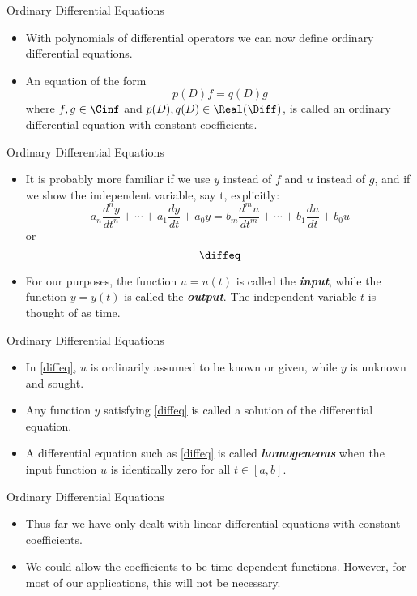 \begin{frame}
Ordinary Differential Equations
 \begin{itemize}
 \item With polynomials of differential operators we can now
 define ordinary differential equations.
 \item An equation of the form
 \[p(D)f=q(D)g\]
 where  $f,g\in \Cinf$ and $p(D),q(D)\in \Real(\Diff)$,
 is called an ordinary differential equation with constant
 coefficients.
\end{itemize}
\end{frame}
\begin{frame}
Ordinary Differential Equations
 \begin{itemize}
 \item It is probably more familiar if we use $y$
 instead of $f$ and $u$ instead of $g$, and if we show the
 independent variable, say t, explicitly:
 \[a_n\frac{d^ny}{dt^n}+\cdots +a_1\frac{dy}{dt}+a_0y =
 b_m\frac{d^mu}{dt^m}+\cdots + b_1\frac{du}{dt}+b_0u\]
 or
\begin{equation}\label{diffeq}
\diffeq
\end{equation}
 \item For our purposes, the function $u=u(t)$ is called the \textit{\textbf{input}},
 while the function $y=y(t)$ is called the \textit{\textbf{output}}.  The
 independent variable $t$ is thought of as time.
\end{itemize}
\end{frame}
\begin{frame}
Ordinary Differential Equations
 \begin{itemize}
 \item In \eqref{diffeq}, $u$ is ordinarily assumed to be known or given,
 while $y$ is unknown and sought.
 \item Any function $y$
 satisfying \eqref{diffeq} is called a solution of the
 differential equation.
 \item A differential equation such as \eqref{diffeq} is called
 \textit{\textbf{homogeneous}} when the input function $u$ is identically zero
 for all $t\in[a,b]$.
\end{itemize}
\end{frame}
\begin{frame}
Ordinary Differential Equations
 \begin{itemize}
 \item Thus far we have only dealt with linear differential equations
 with constant coefficients.
 \item We could allow the coefficients to be time-dependent
 functions.  However, for most of our applications, this will not
 be necessary.
\end{itemize}
\end{frame}
